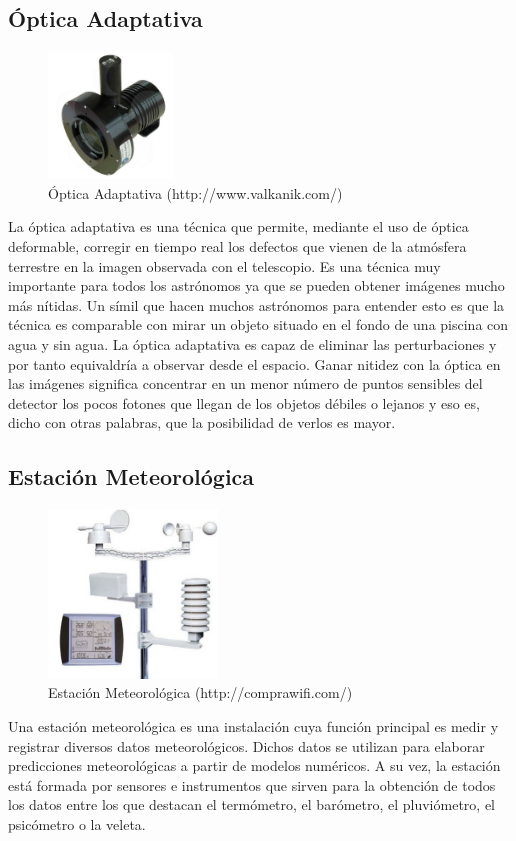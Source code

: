 \subsection{Óptica Adaptativa}
\begin{figure}[htb]
\centering
\includegraphics[width=0.3\textwidth]{./imagenes/opticaAdaptativa}
\caption{Óptica Adaptativa (http://www.valkanik.com/)} \label{fig:opticaAdaptativa}
\end{figure}
La óptica adaptativa es una técnica que permite, mediante el uso de óptica deformable, corregir en tiempo real los defectos que vienen de la atmósfera terrestre en la imagen observada con el telescopio. Es una técnica muy importante para todos los astrónomos ya que se pueden obtener imágenes mucho más nítidas. Un símil que hacen muchos astrónomos para entender esto es que la técnica es comparable con mirar un objeto situado en el fondo de una piscina con agua y sin agua.
La óptica adaptativa es capaz de eliminar las perturbaciones y por tanto equivaldría a observar desde el espacio. Ganar nitidez con la óptica en las imágenes significa concentrar en un menor número de puntos sensibles del detector los pocos fotones que llegan de los objetos débiles o lejanos y eso es, dicho con otras palabras, que la posibilidad de verlos es mayor.


\subsection{Estación Meteorológica}
\begin{figure}[htb]
\centering
\includegraphics[width=0.4\textwidth]{./imagenes/estacionMeteorologica}
\caption{Estación Meteorológica (http://comprawifi.com/)} \label{fig:estacionMeteorologica}
\end{figure}
Una estación meteorológica es una instalación cuya función principal es medir y registrar diversos datos meteorológicos. Dichos datos se utilizan para elaborar predicciones meteorológicas a partir de modelos numéricos.
A su vez, la estación está formada por sensores e instrumentos que sirven para la obtención de todos los datos entre los que destacan el termómetro, el barómetro, el pluviómetro, el psicómetro o la veleta.



